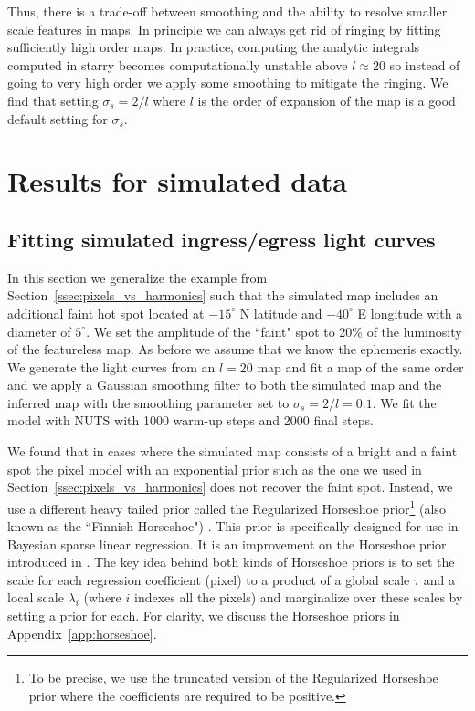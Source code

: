 \documentclass[modern]{aastex62}
\begin{document}
Thus, there is a trade-off between smoothing and the ability to resolve smaller scale features
in maps. 
In principle we can always get rid of ringing by fitting sufficiently high order maps.
In practice, computing the analytic integrals computed in \textsf{starry} becomes computationally unstable above $l\approx 20$ so instead of going to very high order we apply some smoothing to mitigate the ringing.
We find that setting $\sigma_s=2/l$ where $l$ is the order of expansion of the map  is a good default setting for $\sigma_s$.

\section{Results for simulated data}
\label{sec:results_sim}
\subsection{Fitting simulated ingress/egress light curves}
\label{ssec:fitting_sim_ingress_egress}
In this section we generalize the example from Section~\ref{ssec:pixels_vs_harmonics} such that the simulated map includes an additional faint hot spot located at $-15^\circ$ N latitude and $-40^\circ$ E longitude with a diameter of $5^\circ$.
We set the amplitude of the ``faint" spot to 20\% of the luminosity of the featureless map.
As before we assume that we know the ephemeris exactly.
We generate the light curves from an $l=20$ map and fit a map of the same order and we apply a Gaussian smoothing filter to both the simulated map and the inferred map with the smoothing parameter set to $\sigma_s=2/l=0.1$.
We fit the model with NUTS with 1000 warm-up steps and 2000 final steps. 

We found that in cases where the simulated map consists of a bright and a faint spot the pixel model with an exponential prior such as the one we used in Section~\ref{ssec:pixels_vs_harmonics} does not recover the faint spot. 
Instead, we use a different heavy tailed prior called the Regularized Horseshoe prior\footnote{To be precise, we use the truncated version of the Regularized Horseshoe prior where the coefficients are required to be positive.} (also known as the ``Finnish Horseshoe") \citep{piironen2017}.
This prior is specifically designed for use in Bayesian sparse linear regression. 
It is an improvement on the Horseshoe prior introduced in \cite{carvalho2010a}.
The key idea behind both kinds of Horseshoe priors is to set the scale for each regression coefficient (pixel) to a product of a global scale $\tau$ and a local scale $\lambda_i$ (where $i$ indexes all the pixels) and marginalize over these scales by setting a prior for each. 
For clarity, we discuss the Horseshoe priors in Appendix~\ref{app:horseshoe}.
\end{document}
